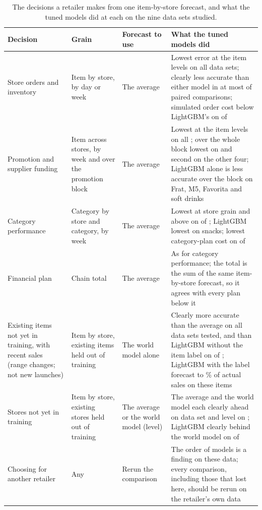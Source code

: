 \begin{table}[t]
\centering
\caption{The decisions a retailer makes from one item-by-store forecast, and what
the tuned models did at each on the nine data sets studied.}
\label{tab:advice}
\footnotesize
\renewcommand{\arraystretch}{1.2}
\begin{tabular}{p{}p{}p{}p{}}
\toprule
\textbf{Decision} & \textbf{Grain} & \textbf{Forecast to use} & \textbf{What the tuned models did} \\
\midrule
Store orders and inventory & Item by store, by day or week & The average & Lowest error at the item levels on all \rqAvgBestItemWord{} data sets; clearly less accurate than either model in at most \rqAvgItemWorseMax{} of \rqPAvgWmItemn{} paired comparisons; simulated order cost below LightGBM's on \supOrderAvgBelowLgb{} of \supOrderSets{} \\
Promotion and supplier funding & Item across stores, by week and over the promotion block & The average & Lowest at the item levels on all \rqAvgBestItemWord{}; over the whole block lowest on \rqAvgBestBlockWord{} and second on the other four; LightGBM alone is less accurate over the block on Frat, M5, Favorita and soft drinks \\
Category performance & Category by store and category, by week & The average & Lowest at store grain and above on \rqAvgBestCoarseWord{} of \rqNineWord{}; LightGBM lowest on snacks; lowest category-plan cost on \supCatPlanAvgLowest{} of \supCatPlanSets{} \\
Financial plan & Chain total & The average & As for category performance; the total is the sum of the same item-by-store forecast, so it agrees with every plan below it \\
Existing items not yet in training, with recent sales (range changes; not new launches) & Item by store, existing items held out of training & The world model alone & Clearly more accurate than the average on all \rqKeptSets{} data sets tested, and than LightGBM without the item label on \rqWmBeatsNoid{} of \rqNoidSets{}; LightGBM with the label forecast \rqFaLgbItemLo{} to \rqFaLgbItemHi{}\% of actual sales on these items \\
Stores not yet in training & Item by store, existing stores held out of training & The average or the world model (level) & The average and the world model each clearly ahead on \rqStoreAvgBeatsWm{} data set and level on \rqStoreLevel{}; LightGBM clearly behind the world model on \rqStoreWmBeatsLgb{} of \rqKeptSets{} \\
Choosing for another retailer & Any & Rerun the comparison & The order of models is a finding on these data; every comparison, including those that lost here, should be rerun on the retailer's own data \\
\bottomrule
\end{tabular}
\end{table}

